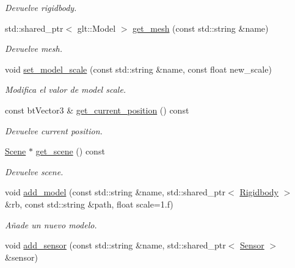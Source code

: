 \begin{DoxyCompactItemize}
\begin{DoxyCompactList}\small\item\em Devuelve rigidbody. \end{DoxyCompactList}\item 
std\+::shared\+\_\+ptr$<$ glt\+::\+Model $>$ \mbox{\hyperlink{classexample_1_1_entity_afd9c242b61271516546ae88c92563d63}{get\+\_\+mesh}} (const std\+::string \&name)
\begin{DoxyCompactList}\small\item\em Devuelve mesh. \end{DoxyCompactList}\item 
void \mbox{\hyperlink{classexample_1_1_entity_ad9d57f2c8d41b5b977a79a0b8d24d859}{set\+\_\+model\+\_\+scale}} (const std\+::string \&name, const float new\+\_\+scale)
\begin{DoxyCompactList}\small\item\em Modifica el valor de model scale. \end{DoxyCompactList}\item 
const bt\+Vector3 \& \mbox{\hyperlink{classexample_1_1_entity_ac6b2db209c5da0fbe592f36e2c93ab61}{get\+\_\+current\+\_\+position}} () const
\begin{DoxyCompactList}\small\item\em Devuelve current position. \end{DoxyCompactList}\item 
\mbox{\hyperlink{classexample_1_1_scene}{Scene}} $\ast$ \mbox{\hyperlink{classexample_1_1_entity_a6d32a518949bb42bed3d13377c2ab7ad}{get\+\_\+scene}} () const
\begin{DoxyCompactList}\small\item\em Devuelve scene. \end{DoxyCompactList}\item 
void \mbox{\hyperlink{classexample_1_1_entity_a223feca4d40f767273389a9afb971149}{add\+\_\+model}} (const std\+::string \&name, std\+::shared\+\_\+ptr$<$ \mbox{\hyperlink{classexample_1_1_rigidbody}{Rigidbody}} $>$ \&rb, const std\+::string \&path, float scale=1.f)
\begin{DoxyCompactList}\small\item\em Añade un nuevo modelo. \end{DoxyCompactList}\item 
void \mbox{\hyperlink{classexample_1_1_entity_a54b9835b10be36670f4008dd633e7133}{add\+\_\+sensor}} (const std\+::string \&name, std\+::shared\+\_\+ptr$<$ \mbox{\hyperlink{classexample_1_1_sensor}{Sensor}} $>$ \&sensor)

\end{DoxyCompactItemize}
